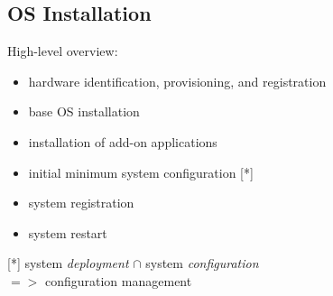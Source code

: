 \documentclass[xga]{xdvislides}
\begin{document}
%
%
%
%

\subsection{OS Installation}
High-level overview:
\begin{itemize}
	\item hardware identification, provisioning, and registration
	\item base OS installation
	\item installation of add-on applications
	\item initial minimum system configuration [*]
	\item system registration
	\item system restart
\end{itemize}
\vspace*{\fill}
[*] system {\em deployment} $\cap$ system {\em configuration} \\
$ => $ configuration management
\end{document}
